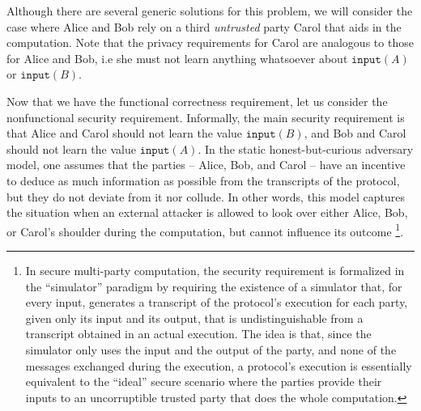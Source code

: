 \documentclass[preprint]{sig-alternate-05-2015}
\begin{document}
Although there are several generic solutions for this problem,
we will consider the case where Alice and Bob rely on a third
{\em untrusted} party Carol that aids in the computation.
Note that the privacy requirements for Carol are analogous
to those for Alice and Bob, i.e she must not learn anything 
whatsoever about $\mathtt{input}(A)$ or $\mathtt{input}(B)$.




Now that we have the functional correctness requirement, let us consider
the nonfunctional security requirement.
Informally, the main security requirement is that 
Alice and Carol should not learn the value $\mathtt{input}(B)$,
and Bob and Carol should not learn the value $\mathtt{input}(A)$.
In the static honest-but-curious adversary model, one assumes that 
the parties -- Alice, Bob, and Carol -- have an incentive to 
deduce as much information as possible from the transcripts
of the protocol, but they do not deviate from it nor collude.
In other words, this model captures the situation when 
an external attacker is allowed to look over
either Alice, Bob, or Carol's shoulder during the computation, 
but cannot influence its outcome%
\footnote{%
In secure multi-party computation, the security requirement is formalized
in the ``simulator'' paradigm by requiring the existence 
of a simulator that, for every input, generates a transcript of the protocol's execution 
for each party,
given only its input and its output,
that is undistinguishable from a transcript obtained in an actual execution.
The idea is that, since the simulator only uses the 
input and the output of the party, and none of the 
messages exchanged during the execution, 
a protocol's execution is essentially equivalent
to the ``ideal'' secure scenario where the parties provide their 
inputs to an uncorruptible trusted party that does the whole computation.}.
\end{document}
